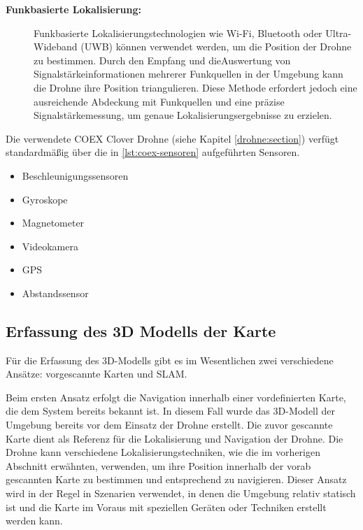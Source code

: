 \begin{description}
    \item [\textbf{Funkbasierte Lokalisierung:}] Funkbasierte Lokalisierungstechnologien wie Wi-Fi, Bluetooth oder Ultra-Wideband (UWB) können verwendet werden, um die Position der Drohne zu bestimmen. Durch den Empfang und dieAuswertung von Signalstärkeinformationen mehrerer Funkquellen in der Umgebung kann die Drohne ihre Position triangulieren. Diese Methode erfordert jedoch eine ausreichende Abdeckung mit Funkquellen und eine präzise Signalstärkemessung, um genaue Lokalisierungsergebnisse zu erzielen.
\end{description}

Die verwendete COEX Clover Drohne (siehe Kapitel \ref{drohne:section}) verfügt standardmäßig über die in \ref{lst:coex-sensoren} aufgeführten Sensoren.

\begin{center}
\begin{itemize}
    \item Beschleunigungssensoren 
    \item Gyroskope
    \item Magnetometer
    \item Videokamera
    \item GPS
    \item Abstandssensor
\end{itemize}
\label{lst:coex-sensoren}
\end{center}

\subsection{Erfassung des 3D Modells der Karte} \label{erfassung_des_3d-modells:subsection}

Für die Erfassung des 3D-Modells gibt es im Wesentlichen zwei verschiedene Ansätze: vorgescannte Karten und \ac{SLAM}.

Beim ersten Ansatz erfolgt die Navigation innerhalb einer vordefinierten Karte, die dem System bereits bekannt ist. In diesem Fall wurde das 3D-Modell der Umgebung bereits vor dem Einsatz der Drohne erstellt. Die zuvor gescannte Karte dient als Referenz für die Lokalisierung und Navigation der Drohne. Die Drohne kann verschiedene Lokalisierungstechniken, wie die im vorherigen Abschnitt erwähnten, verwenden, um ihre Position innerhalb der vorab gescannten Karte zu bestimmen und entsprechend zu navigieren. Dieser Ansatz wird in der Regel in Szenarien verwendet, in denen die Umgebung relativ statisch ist und die Karte im Voraus mit speziellen Geräten oder Techniken erstellt werden kann.

